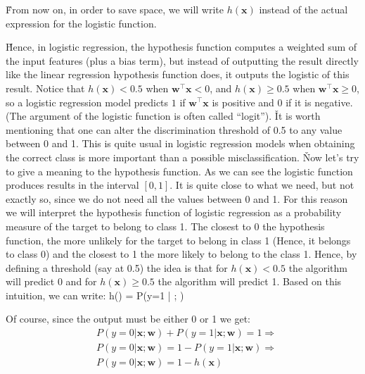 \v

From now on, in order to save space, we will write $h(\boldsymbol{x})$ instead of the actual expression for the
logistic function.

\vspace{-5pt}


\v

Hence, in logistic regression, the hypothesis function computes a weighted sum of the input features (plus a bias
term), but instead of outputting the result directly like the linear regression hypothesis function does, it outputs
the logistic of this result. Notice that $h(\boldsymbol{x}) < 0.5$ when $\boldsymbol{w}^{\intercal} \boldsymbol{x} <
0$, and $h(\boldsymbol{x}) \geq 0.5$ when $\boldsymbol{w}^{\intercal} \boldsymbol{x} \geq 0$, so a logistic
regression model predicts $1$ if $\boldsymbol{w}^{\intercal} \boldsymbol{x}$ is positive and 0 if it is negative.
(The argument of the logistic function is often called ``logit''). \v

It is worth mentioning that one can alter the discrimination threshold of 0.5 to any value between 0 and 1. This is
quite usual in logistic regression models when obtaining the correct class is more important than a possible
misclassification. \v

Now let's try to give a meaning to the hypothesis function. As we can see the logistic function produces results in
the interval $[0,1]$. It is quite close to what we need, but not exactly so, since we do not need all the values
between 0 and 1. For this reason we will interpret the hypothesis function of logistic regression as a probability
measure of the target to belong to class 1. The closest to 0 the hypothesis function, the more unlikely for the
target to belong in class 1 (Hence, it belongs to class 0) and the closest to 1 the more likely to belong to the class
1. Hence, by defining a threshold (say at 0.5) the idea is that for $h (\boldsymbol{x}) <0.5$ the algorithm will
predict 0 and for $h(\boldsymbol{x}) \geq 0.5$ the algorithm will predict 1. Based on this intuition, we can write:
\bse
h() = P(y=1 | ; )
\ese

Of course, since the output must be either 0 or 1 we get:
\begin{align*}
& P(y=0 | \boldsymbol{x}; \boldsymbol{w}) + P(y=1 | \boldsymbol{x}; \boldsymbol{w}) = 1 \Rightarrow \\
& P(y=0 | \boldsymbol{x}; \boldsymbol{w}) = 1 - P(y=1 | \boldsymbol{x}; \boldsymbol{w}) \Rightarrow \\
& P(y=0 | \boldsymbol{x}; \boldsymbol{w}) = 1 - h(\boldsymbol{x})
\end{align*}


